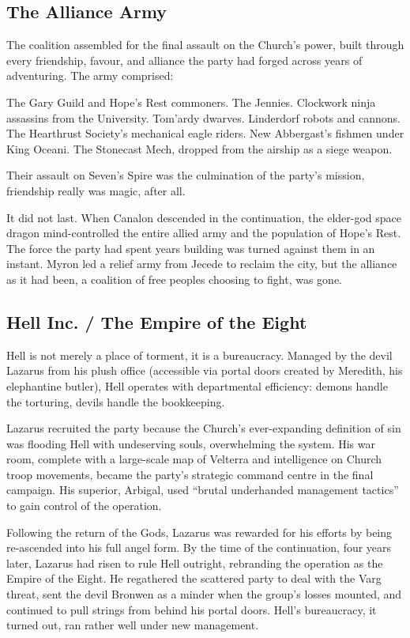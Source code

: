 \subsection*{The Alliance Army}

The coalition assembled for the final assault on the Church's power, built through every friendship, favour, and alliance the party had forged across years of adventuring.  The army comprised:

The Gary Guild and Hope's Rest commoners.  The Jennies.  Clockwork ninja assassins from the University.  Tom'ardy dwarves.  Linderdorf robots and cannons.  The Hearthrust Society's mechanical eagle riders.  New Abbergast's fishmen under King Oceani.  The Stonecast Mech, dropped from the airship as a siege weapon.

Their assault on Seven's Spire was the culmination of the party's mission, friendship really was magic, after all.

It did not last.  When Canalon descended in the continuation, the elder-god space dragon mind-controlled the entire allied army and the population of Hope's Rest.  The force the party had spent years building was turned against them in an instant.  Myron led a relief army from Jecede to reclaim the city, but the alliance as it had been, a coalition of free peoples choosing to fight, was gone.

\smallskip

\subsection*{Hell Inc. / The Empire of the Eight}

Hell is not merely a place of torment, it is a bureaucracy.  Managed by the devil Lazarus from his plush office (accessible via portal doors created by Meredith, his elephantine butler), Hell operates with departmental efficiency: demons handle the torturing, devils handle the bookkeeping.

Lazarus recruited the party because the Church's ever-expanding definition of sin was flooding Hell with undeserving souls, overwhelming the system.  His war room, complete with a large-scale map of Velterra and intelligence on Church troop movements, became the party's strategic command centre in the final campaign.  His superior, Arbigal, used ``brutal underhanded management tactics'' to gain control of the operation.

Following the return of the Gods, Lazarus was rewarded for his efforts by being re-ascended into his full angel form.  By the time of the continuation, four years later, Lazarus had risen to rule Hell outright, rebranding the operation as the Empire of the Eight.  He regathered the scattered party to deal with the Varg threat, sent the devil Bronwen as a minder when the group's losses mounted, and continued to pull strings from behind his portal doors.  Hell's bureaucracy, it turned out, ran rather well under new management.

